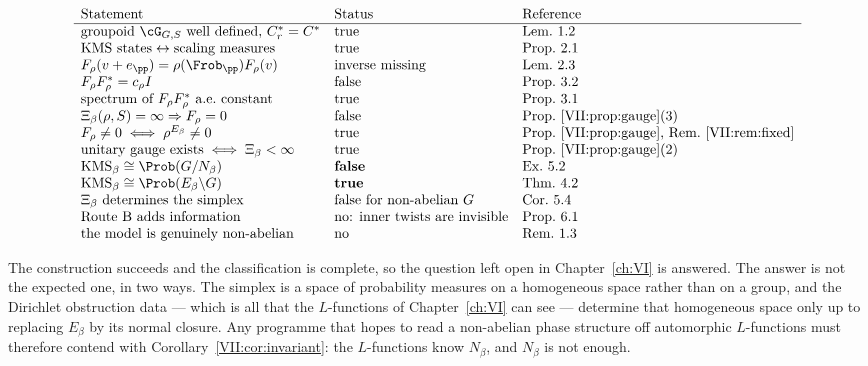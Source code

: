 \[
\begin{array}{lll}
\text{Statement} & \text{Status} & \text{Reference}\\\hline
\text{groupoid }\cG_{G,S}\text{ well defined, }C^*_r=C^*&\text{true}&\text{Lem.~1.2}\\
\text{KMS states}\leftrightarrow\text{scaling measures}&\text{true}&\text{Prop.~2.1}\\
F_\rho(v+e_\pp)=\rho(\Frob_\pp)F_\rho(v)&\text{inverse missing}&\text{Lem.~2.3}\\
F_\rho F_\rho^*=c_\rho I&\text{false}&\text{Prop.~3.2}\\
\text{spectrum of }F_\rho F_\rho^*\text{ a.e.\ constant}&\text{true}&\text{Prop.~3.1}\\
\Xi_\beta(\rho,S)=\infty\Rightarrow F_\rho=0&\text{false}&\text{Prop.~\ref{VII:prop:gauge}(3)}\\
F_\rho\ne0\iff\rho^{E_\beta}\ne0&\text{true}&\text{Prop.~\ref{VII:prop:gauge}, Rem.~\ref{VII:rem:fixed}}\\
\text{unitary gauge exists}\iff\Xi_\beta<\infty&\text{true}&\text{Prop.~\ref{VII:prop:gauge}(2)}\\
\mathrm{KMS}_\beta\cong\Prob(G/N_\beta)&\textbf{false}&\text{Ex.~5.2}\\
\mathrm{KMS}_\beta\cong\Prob(E_\beta\backslash G)&\textbf{true}&\text{Thm.~4.2}\\
\Xi_\beta\text{ determines the simplex}&\text{false for non-abelian }G&\text{Cor.~5.4}\\
\text{Route B adds information}&\text{no: inner twists are invisible}&\text{Prop.~6.1}\\
\text{the model is genuinely non-abelian}&\text{no}&\text{Rem.~1.3}
\end{array}
\]

The construction succeeds and the classification is complete, so the question left open in
Chapter~\ref{ch:VI} is answered. The answer is not the expected one, in two ways. The simplex
is a space of probability measures on a homogeneous space rather than on a group, and the
Dirichlet obstruction data --- which is all that the $L$-functions of Chapter~\ref{ch:VI} can
see --- determine that homogeneous space only up to replacing $E_\beta$ by its normal
closure. Any programme that hopes to read a non-abelian phase structure off automorphic
$L$-functions must therefore contend with Corollary~\ref{VII:cor:invariant}: the $L$-functions
know $N_\beta$, and $N_\beta$ is not enough.

